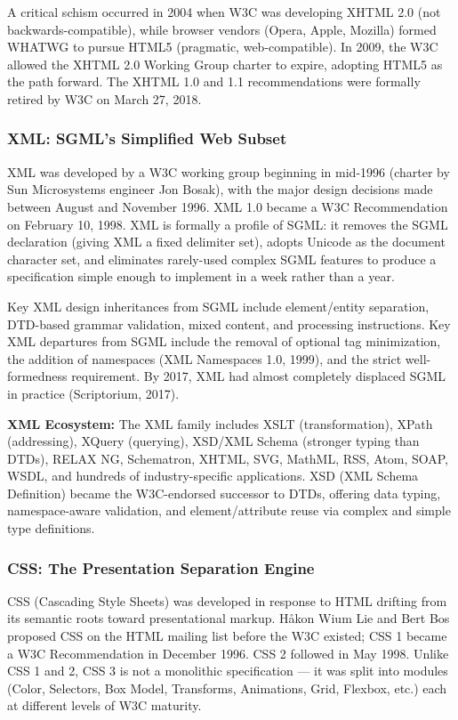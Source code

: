 \documentclass[11pt,letterpaper]{article}
\begin{document}
A critical schism occurred in 2004 when W3C was developing XHTML 2.0 (not backwards-compatible), while browser vendors (Opera, Apple, Mozilla) formed WHATWG to pursue HTML5 (pragmatic, web-compatible). In 2009, the W3C allowed the XHTML 2.0 Working Group charter to expire, adopting HTML5 as the path forward. The XHTML 1.0 and 1.1 recommendations were formally retired by W3C on March 27, 2018.

\subsubsection{XML: SGML's Simplified Web Subset}

XML was developed by a W3C working group beginning in mid-1996 (charter by Sun Microsystems engineer Jon Bosak), with the major design decisions made between August and November 1996. XML 1.0 became a W3C Recommendation on February 10, 1998. XML is formally a profile of SGML: it removes the SGML declaration (giving XML a fixed delimiter set), adopts Unicode as the document character set, and eliminates rarely-used complex SGML features to produce a specification simple enough to implement in a week rather than a year.

Key XML design inheritances from SGML include element/entity separation, DTD-based grammar validation, mixed content, and processing instructions. Key XML departures from SGML include the removal of optional tag minimization, the addition of namespaces (XML Namespaces 1.0, 1999), and the strict well-formedness requirement. By 2017, XML had almost completely displaced SGML in practice (Scriptorium, 2017).

\textbf{XML Ecosystem:} The XML family includes XSLT (transformation), XPath (addressing), XQuery (querying), XSD/XML Schema (stronger typing than DTDs), RELAX NG, Schematron, XHTML, SVG, MathML, RSS, Atom, SOAP, WSDL, and hundreds of industry-specific applications. XSD (XML Schema Definition) became the W3C-endorsed successor to DTDs, offering data typing, namespace-aware validation, and element/attribute reuse via complex and simple type definitions.

\subsubsection{CSS: The Presentation Separation Engine}

CSS (Cascading Style Sheets) was developed in response to HTML drifting from its semantic roots toward presentational markup. Håkon Wium Lie and Bert Bos proposed CSS on the HTML mailing list before the W3C existed; CSS 1 became a W3C Recommendation in December 1996. CSS 2 followed in May 1998. Unlike CSS 1 and 2, CSS 3 is not a monolithic specification --- it was split into modules (Color, Selectors, Box Model, Transforms, Animations, Grid, Flexbox, etc.) each at different levels of W3C maturity.
\end{document}
